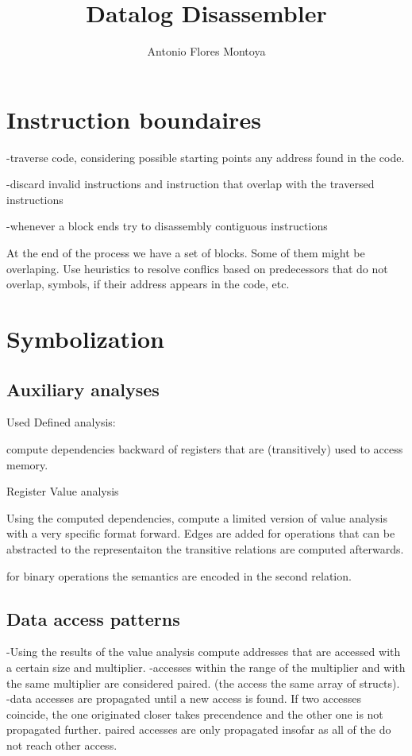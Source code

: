 \documentclass[]{llncs}
\author{Antonio Flores Montoya}
\title{Datalog Disassembler}
\begin{document}
\maketitle

\section{Instruction boundaires}
-traverse code, considering possible starting points any address found in the code.

-discard invalid instructions and instruction that overlap with the traversed
instructions

-whenever a block ends try to disassembly contiguous instructions

At the end of the process we have a set of blocks. Some of them might be overlaping.
Use heuristics to resolve conflics
based on predecessors that do not overlap, symbols, if their address appears in the code,
etc.


\section{Symbolization}
\subsection{Auxiliary analyses}
Used Defined analysis:

compute dependencies backward of registers that are (transitively) used to access
memory.


Register Value analysis

Using the computed dependencies, compute a limited version of value analysis with a
very specific format forward.
Edges are added for operations that can be abstracted to the representaiton
the transitive relations are computed afterwards.

for binary operations the semantics are encoded in the second relation.



\subsection{Data access patterns}
-Using the results of the value analysis compute addresses that are accessed with
a certain size and multiplier.
-accesses within the range of the multiplier and with the same multiplier are considered
paired. (the access the same array of structs).
-data accesses are propagated until a new access is found.
If two accesses coincide, the one originated closer takes precendence and the
other one is not propagated further.
paired accesses are only propagated insofar as all of the do not reach other access.
\end{document}
